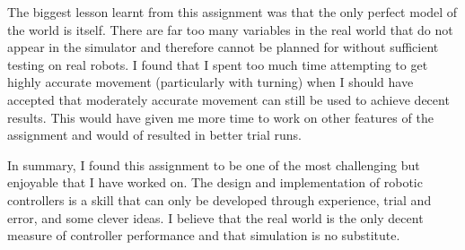 \documentclass{article}
\begin{document}
The biggest lesson learnt from this assignment was that the only perfect model of the world is itself. There are far too many variables in the real world that do not appear in the simulator and therefore cannot be planned for without sufficient testing on real robots. I found that I spent too much time attempting to get highly accurate movement (particularly with turning) when I should have accepted that moderately accurate movement can still be used to achieve decent results. This would have given me more time to work on other features of the assignment and would of resulted in better trial runs.

In summary, I found this assignment to be one of the most challenging but enjoyable that I have worked on. The design and implementation of robotic controllers is a skill that can only be developed through experience, trial and error, and some clever ideas. I believe that the real world is the only decent measure of controller performance and that simulation is no substitute.
\end{document}
